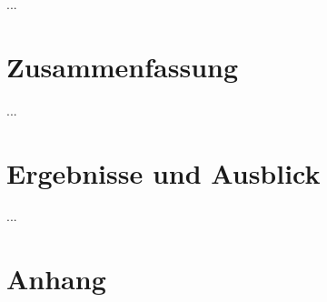 \documentclass[10pt,a4paper,headinclude,twoside, plainheadsepline, open=right, numbers=noenddot, twocolumn]{article}
\begin{document}
...


\section{Zusammenfassung}
\label{resume}

...

\section{Ergebnisse und Ausblick}
\label{end}

...

%
\printbibliography


\appendix
\section{Anhang}
\label{anhang}
\end{document}
